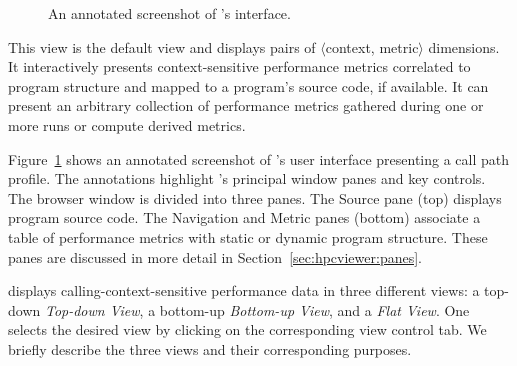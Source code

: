 \begin{figure}[t]
\caption{An annotated screenshot of \hpcviewer{}'s interface.}
\label{fig:hpcviewer-legend}
\end{figure}

This view is the default view and displays pairs of $\langle$context, metric$\rangle$ dimensions.
It interactively presents context-sensitive performance metrics correlated to program structure and mapped to a program's source code, if available.
It can present an arbitrary collection of performance metrics gathered during one or more runs or compute derived metrics.

Figure~\ref{fig:hpcviewer-legend} shows an annotated screenshot of \hpcviewer{}'s user interface presenting a call path profile.
The annotations highlight \hpcviewer{}'s principal window panes and key controls.
The browser window is divided into three panes.
The Source pane (top) displays program source code.
The Navigation and Metric panes (bottom) associate a table of performance metrics with static or dynamic program structure.
These panes are discussed in more detail in Section~\ref{sec:hpcviewer:panes}.

\hpcviewer{} displays calling-context-sensitive performance data in three different views: a top-down \emph{Top-down View}, a bottom-up \emph{Bottom-up View}, and a \emph{Flat View}.
One selects the desired view by clicking on the corresponding view control tab.
We briefly describe the three views and their corresponding purposes.

